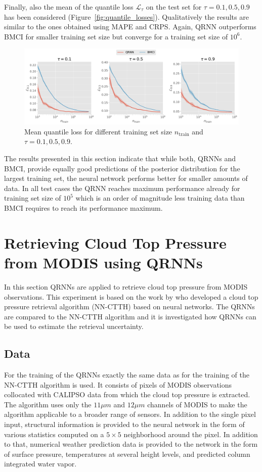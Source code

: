 \documentclass[journal abbreviation, manuscript]{copernicus}
\begin{document}
  Finally, also the mean of the quantile loss $\mathcal{L}_\tau$ on the test set
  for $\tau = 0.1, 0.5, 0.9$ has been considered
  (Figure~\ref{fig:quantile_losses}). Qualitatively the results are similar to
  the ones obtained using MAPE and CRPS. Again, QRNN outperforms BMCI for
  smaller training set size but converge for a training set size of $10^6$.

  \begin{figure}[hbpt!]
    \centering
    \includegraphics[width = 0.8\linewidth]{../plots/quantile_losses}
    \caption{Mean quantile loss for different training set size $n_\text{train}$ and
    $\tau = 0.1, 0.5, 0.9$.}
    \label{fig:mape_crps}
  \end{figure}

  The results presented in this section indicate that while both, QRNNs and
  BMCI, provide equally good predictions of the posterior distribution for the
  largest training set, the neural network performs better for smaller amounts
  of data. In all test cases the QRNN reaches maximum performance already for
  training set size of $10^5$ which is an order of magnitude less training data
  than BMCI requires to reach its performance maximum.

\section{Retrieving Cloud Top Pressure from MODIS using QRNNs}

In this section QRNNs are applied to retrieve cloud top pressure from MODIS
observations. This experiment is based on the work by \cite{hakansson} who
developed a cloud top pressure retrieval algorithm (NN-CTTH) based on neural
networks. The QRNNs are compared to the NN-CTTH algorithm and it is investigated
how QRNNs can be used to estimate the retrieval uncertainty.

\subsection{Data}

For the training of the QRNNs exactly the same data as for the training of the
NN-CTTH algorithm is used. It consists of pixels of MODIS observations collocated
with CALIPSO data from which the cloud top pressure is extracted. The algorithm
uses only the $11 \unit{\mu m}$ and $12\unit{\mu m}$ channels of MODIS to make the
algorithm applicable to a broader range of sensors. In addition to the single pixel
input, structural information is provided to the neural network in the form of various
statistics computed on a $5 \times 5$ neighborhood around the pixel. In addition
to that, numerical weather prediction data is provided to the network in the form
of surface pressure, temperatures at several height levels, and predicted column
integrated water vapor.
\end{document}
